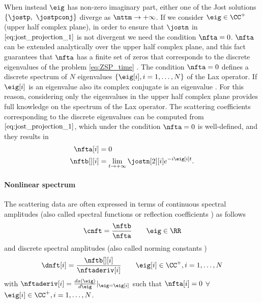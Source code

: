 When instead $\eig$ has non-zero imaginary part, either one of the Jost
solutions $\{\jostp,~\jostpconj\}$ diverge as $\nttm \rightarrow + \infty$. If
we consider $\eig \in \CC^{+}$ (upper half complex plane), in order to ensure
that $\jostn$ in $\eqref{eq:jost_projection_1}$ is not divergent we need the condition $\nfta = 0$. $\nfta$ can be extended analytically over the upper half complex plane, and this fact guarantees that $\nfta$ has a finite set of zeros that corresponds to the discrete eigenvalues of the problem \eqref{eq:ZSP_time} \cite{shabat1972exact,Ablowitz2004a}. The condition $\nfta = 0$ defines a discrete spectrum of $N$ eigenvalues
$\{\eig[i], i=1,\dots,N\}$ of the Lax operator. If $\eig[i]$ is an eigenvalue also
its complex conjugate is an eigenvalue \cite{Yousefi2014}. For this reason,
considering only the eigenvalues in the upper half complex plane provides full
knowledge on the spectrum of the Lax operator.
The scattering coefficients corresponding to the discrete eigenvalues can be computed from $\eqref{eq:jost_projection_1}$, which under the condition $\nfta = 0$ is well-defined, and they results in
\begin{subequations}
  \begin{align}
    \nfta[i]&=0\\
    \nftb[][i]&=\lim_{t \to +\infty}
              \jostn[2][i] e^{-i\eig[i] t}.
  \end{align}
\end{subequations}

\paragraph{Nonlinear spectrum}
The
scattering data are often expressed in terms of continuous spectral amplitudes (also
called spectral functions \cite{Yousefi2014} or reflection coefficients
\cite{Ablowitz2004a}) as follows
\begin{equation}
  \cnft=\dfrac{\nftb}{\nfta} \qquad \eig\in \RR
\end{equation}
and discrete spectral amplitudes (also called norming constants
\cite{Ablowitz2004a})
\begin{equation}
  \dnft[i]=\dfrac{\nftb[][i]}{\nftaderiv[i]} \qquad \eig[i] \in \CC^+, i = 1,\dots, N
\end{equation}
with $\nftaderiv[i]=\frac{da(\eig)}{d\eig}|_{\eig=\eig[i]}$ such
that $\nfta[i]=0$ $\forall$ $\eig[i] \in \CC^+, i = 1,\dots, N$.

